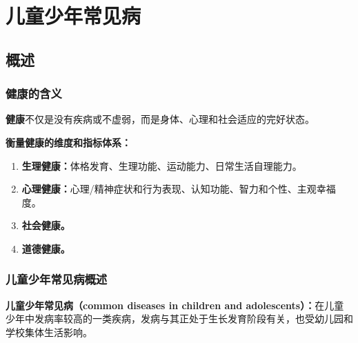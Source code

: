 \chapter{儿童少年常见病}
\setcounter{chapter}{7}

\section{概述}

\subsection{健康的含义}

\begin{defbox}
\textbf{健康}不仅是没有疾病或不虚弱，而是身体、心理和社会适应的完好状态。

\textbf{衡量健康的维度和指标体系：}
\begin{enumerate}[leftmargin=*]
    \item \textbf{生理健康：}体格发育、生理功能、运动能力、日常生活自理能力。
    \item \textbf{心理健康：}心理/精神症状和行为表现、认知功能、智力和个性、主观幸福度。
    \item \textbf{社会健康。}
    \item \textbf{道德健康。}
\end{enumerate}
\end{defbox}

\subsection{儿童少年常见病概述}

\begin{defbox}
\textbf{儿童少年常见病（common diseases in children and adolescents）：}在儿童少年中发病率较高的一类疾病，发病与其正处于生长发育阶段有关，也受幼儿园和学校集体生活影响。
\end{defbox}

